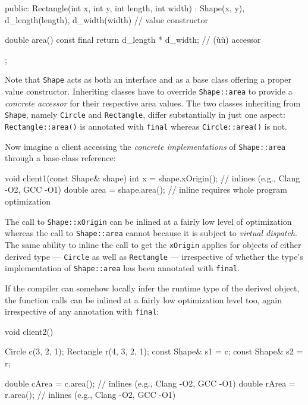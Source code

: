 {{\begin{emcppslisting}
{public:
    Rectangle(int x, int y, int length, int width) :
                       Shape(x, y), d_length(length), d_width(width) { }
                                                // value constructor

    double area() const final { return d_length * d_width; }
                                                // (ù{}ù) accessor
};
\end{emcppslisting}
    

\noindent Note that \lstinline!Shape! acts as both an interface and as a base class
offering a proper value constructor. Inheriting classes have to override
\lstinline!Shape::area! to provide a \emph{concrete accessor} for their
respective area values. The two classes inheriting from \lstinline!Shape!,
namely \lstinline!Circle! and \lstinline!Rectangle!, differ substantially in
just one aspect: \lstinline!Rectangle::area()! is annotated with
\lstinline!final! whereas \lstinline!Circle::area()! is not.

Now imagine a client accessing the \emph{concrete implementations} of
\lstinline!Shape::area! through a base-class reference:

\begin{emcppslisting}
void client1(const Shape& shape)
{
    int x = shape.xOrigin();     // inlines (e.g., Clang -O2, GCC -O1)
    double area = shape.area();  // inline requires whole program optimization
}
\end{emcppslisting}
    

\noindent The call to \lstinline!Shape::xOrigin! can be inlined at a fairly low level
of optimization whereas the call to \lstinline!Shape::area! cannot because
it is subject to \emph{virtual dispatch}. The same ability to inline the
call to get the \lstinline!xOrigin! applies for objects of either derived
type --- \lstinline!Circle! as well as \lstinline!Rectangle! --- irrespective
of whether the type's implementation of \lstinline!Shape::area! has been
annotated with \lstinline!final!.

If the compiler can somehow locally infer the runtime type of the
derived object, the function calls can be inlined at a fairly low
optimization level too, again irrespective of any annotation with
\lstinline!final!:

\begin{emcppslisting}
void client2()
{
    Circle c(3, 2, 1);
    Rectangle r(4, 3, 2, 1);
    const Shape& s1 = c;
    const Shape& s2 = r;

    double cArea = c.area();  // inlines (e.g., Clang -O2, GCC -O1)
    double rArea = r.area();  // inlines (e.g., Clang -O2, GCC -O1)

}
\end{emcppslisting}}}

